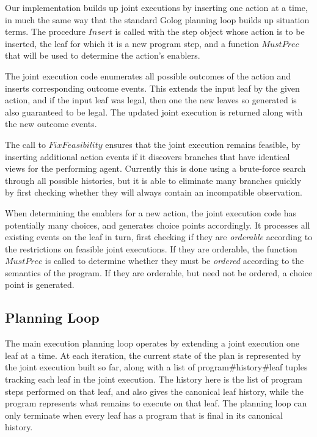 Our implementation builds up joint executions by inserting one action
at a time, in much the same way that the standard Golog planning loop
builds up situation terms. The procedure $Insert$ is called with
the step object whose action is to be inserted, the leaf for which
it is a new program step, and a function $MustPrec$ that will be
used to determine the action's enablers.


The joint execution code enumerates all possible outcomes of the action
and inserts corresponding outcome events. This extends the input leaf
by the given action, and if the input leaf was legal, then one the
new leaves so generated is also guaranteed to be legal. The updated
joint execution is returned along with the new outcome events.

The call to $FixFeasibility$ ensures that the joint execution remains
feasible, by inserting additional action events if it discovers branches
that have identical views for the performing agent. Currently this
is done using a brute-force search through all possible histories,
but it is able to eliminate many branches quickly by first checking
whether they will always contain an incompatible observation.

When determining the enablers for a new action, the joint execution
code has potentially many choices, and generates choice points accordingly.
It processes all existing events on the leaf in turn, first checking
if they are \emph{orderable} according to the restrictions on feasible
joint executions. If they are orderable, the function $MustPrec$
is called to determine whether they must be \emph{ordered} according
to the semantics of the program. If they are orderable, but need not
be ordered, a choice point is generated.



\subsection{Planning Loop}

The main execution planning loop operates by extending a joint execution
one leaf at a time. At each iteration, the current state of the plan
is represented by the joint execution built so far, along with a list
of program\#history\#leaf tuples tracking each leaf in the joint execution.
The history here is the list of program steps performed on that leaf,
and also gives the canonical leaf history, while the program represents
what remains to execute on that leaf. The planning loop can only terminate
when every leaf has a program that is final in its canonical history.

